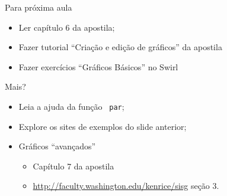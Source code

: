 \documentclass{beamer}
\begin{document}
\begin{frame}{Para próxima aula}

  \begin{itemize}
  \item Ler capítulo 6 da apostila;
  \item Fazer tutorial ``Criação e edição de gráficos'' da apostila
  \item Fazer exercícios ``Gráficos Básicos'' no Swirl
  \end{itemize} \pause
Mais?

\begin{itemize}
\item Leia a ajuda da função \texttt{ par};
\item Explore os sites de exemplos do slide anterior;
\item Gráficos ``avançados''
  \begin{itemize}
  \item Capítulo 7 da apostila
  \item \url{http://faculty.washington.edu/kenrice/sisg} seção 3. 
  \end{itemize}

\end{itemize}
\end{frame}
\end{document}
